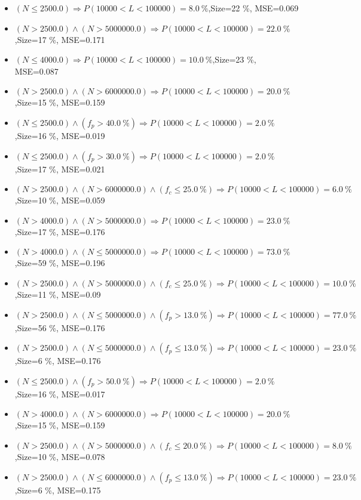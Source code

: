 \documentclass[numbered]{CSL}
\begin{document}
\begin{itemize}
\item $(N \leq 2500.0) \Rightarrow P(10 000 < L < 100 000) = 8.0~\%$,\hfill Size=22 \%, MSE=0.069
\item $(N > 2500.0) \land (N > 5000000.0) \Rightarrow P(10 000 < L < 100 000) = 22.0~\%$,\hfill Size=17 \%, MSE=0.171
\item $(N \leq 4000.0) \Rightarrow P(10 000 < L < 100 000) = 10.0~\%$,\hfill Size=23 \%, MSE=0.087
\item $(N > 2500.0) \land (N > 6000000.0) \Rightarrow P(10 000 < L < 100 000) = 20.0~\%$,\hfill Size=15 \%, MSE=0.159
\item $(N \leq 2500.0) \land (f_p > 40.0~\%) \Rightarrow P(10 000 < L < 100 000) = 2.0~\%$,\hfill Size=16 \%, MSE=0.019
\item $(N \leq 2500.0) \land (f_p > 30.0~\%) \Rightarrow P(10 000 < L < 100 000) = 2.0~\%$,\hfill Size=17 \%, MSE=0.021
\item $(N > 2500.0) \land (N > 6000000.0) \land (f_c \leq 25.0~\%) \Rightarrow P(10 000 < L < 100 000) = 6.0~\%$,\hfill Size=10 \%, MSE=0.059
\item $(N > 4000.0) \land (N > 5000000.0) \Rightarrow P(10 000 < L < 100 000) = 23.0~\%$,\hfill Size=17 \%, MSE=0.176
\item $(N > 4000.0) \land (N \leq 5000000.0) \Rightarrow P(10 000 < L < 100 000) = 73.0~\%$,\hfill Size=59 \%, MSE=0.196
\item $(N > 2500.0) \land (N > 5000000.0) \land (f_c \leq 25.0~\%) \Rightarrow P(10 000 < L < 100 000) = 10.0~\%$,\hfill Size=11 \%, MSE=0.09
\item $(N > 2500.0) \land (N \leq 5000000.0) \land (f_p > 13.0~\%) \Rightarrow P(10 000 < L < 100 000) = 77.0~\%$,\hfill Size=56 \%, MSE=0.176
\item $(N > 2500.0) \land (N \leq 5000000.0) \land (f_p \leq 13.0~\%) \Rightarrow P(10 000 < L < 100 000) = 23.0~\%$,\hfill Size=6 \%, MSE=0.176
\item $(N \leq 2500.0) \land (f_p > 50.0~\%) \Rightarrow P(10 000 < L < 100 000) = 2.0~\%$,\hfill Size=16 \%, MSE=0.017
\item $(N > 4000.0) \land (N > 6000000.0) \Rightarrow P(10 000 < L < 100 000) = 20.0~\%$,\hfill Size=15 \%, MSE=0.159
\item $(N > 2500.0) \land (N > 5000000.0) \land (f_c \leq 20.0~\%) \Rightarrow P(10 000 < L < 100 000) = 8.0~\%$,\hfill Size=10 \%, MSE=0.078
\item $(N > 2500.0) \land (N \leq 6000000.0) \land (f_p \leq 13.0~\%) \Rightarrow P(10 000 < L < 100 000) = 23.0~\%$,\hfill Size=6 \%, MSE=0.175

\end{itemize}
\end{document}
